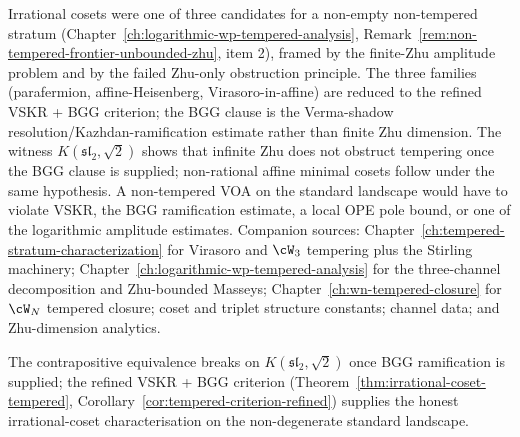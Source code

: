Irrational cosets were one of three candidates for a non-empty
non-tempered stratum
(Chapter~\ref{ch:logarithmic-wp-tempered-analysis},
Remark~\ref{rem:non-tempered-frontier-unbounded-zhu}, item 2), framed
by the finite-Zhu amplitude problem and by the failed Zhu-only
obstruction principle. The three families (parafermion,
affine-Heisenberg, Virasoro-in-affine) are reduced to the refined
VSKR + BGG criterion; the BGG clause is the Verma-shadow
resolution/Kazhdan-ramification estimate rather than finite Zhu
dimension. The witness $K(\mathfrak{sl}_2, \sqrt{2})$ shows that
infinite Zhu does not obstruct tempering once the BGG clause is
supplied; non-rational affine minimal cosets follow under the same
hypothesis. A non-tempered VOA on the standard landscape would have to
violate VSKR, the BGG ramification estimate, a local OPE pole bound, or
one of the logarithmic amplitude estimates.
Companion sources: Chapter~\ref{ch:tempered-stratum-characterization}
for Virasoro and $\cW_3$ tempering plus the Stirling machinery;
Chapter~\ref{ch:logarithmic-wp-tempered-analysis} for the
three-channel decomposition and Zhu-bounded Masseys;
Chapter~\ref{ch:wn-tempered-closure} for $\cW_N$ tempered closure;
coset and triplet structure constants; channel data; and
Zhu-dimension analytics.

The contrapositive equivalence breaks on
$K(\mathfrak{sl}_2, \sqrt{2})$ once BGG ramification is supplied; the
refined VSKR + BGG criterion
(Theorem~\ref{thm:irrational-coset-tempered},
Corollary~\ref{cor:tempered-criterion-refined}) supplies the
honest irrational-coset characterisation on the non-degenerate
standard landscape.

